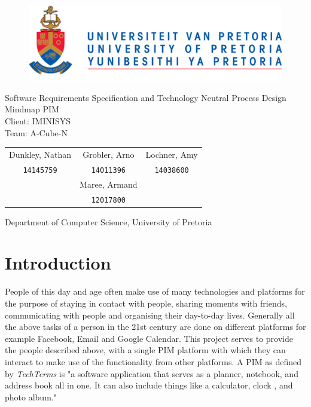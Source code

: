 \documentclass[hidelinks,english]{article}
\date{\today}
\begin{document}
	
	\begin{titlepage}
		\begin{figure}[!t]
			\includegraphics[width=\linewidth]{up_logo.png}
		\end{figure}
		\begin{center}
			\huge{Software Requirements Specification and Technology Neutral Process Design\\}
			\huge{Mindmap PIM}\\
			\large{Client: IMINISYS}\\
			\vspace{10mm}
			\huge{Team: A-Cube-N}\\
		\end{center}
		\begin{center}
			\begin{tabular}{ c c c }
				Dunkley, Nathan & Grobler, Arno & Lochner, Amy \\
				\texttt{14145759} & \texttt{14011396} & \texttt{14038600}\\
				& Maree, Armand &\\
				& \texttt{12017800} &
			\end{tabular}
		\end{center}
		\begin{center}
			Department of Computer Science, University of Pretoria
		\end{center}
	\end{titlepage}
	\newpage
	\tableofcontents
	\newpage
	
	\section{Introduction} 
	People of this day and age often make use of many technologies and platforms for the purpose of staying in contact with people, sharing moments with friends, communicating with people and organising their day-to-day lives. Generally all the above tasks of a person in the 21st century are done on different platforms for example Facebook, Email and Google Calendar. This project serves to provide the people described above, with a single PIM platform with which they can interact to make use of the functionality from other platforms. A PIM as defined by \textit{TechTerms} is "a software application that serves as a planner, notebook, and address book all in one. It can also include things like a calculator, clock , and photo album." 
	
\end{document}
